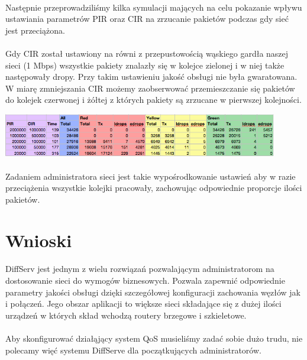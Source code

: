 \documentclass[a4paper]{article}
\begin{document}
\paragraph{}
Następnie przeprowadziliśmy kilka symulacji mających na celu pokazanie wpływu ustawiania parametrów PIR oraz CIR na zrzucanie pakietów podczas gdy sieć jest przeciążona.

\paragraph{}
Gdy CIR został ustawiony na równi z przepustowością wąskiego gardła naszej sieci (1 Mbps) wszystkie pakiety znalazły się w kolejce zielonej i w niej także następowały dropy. Przy takim ustawieniu jakość obsługi nie była gwaratowana.
W miarę zmniejszania CIR możemy zaobserwować przemieszczanie się pakietów do kolejek czerwonej i żółtej z których pakiety są zrzucane w pierwszej kolejności.



\includegraphics[width=120mm]{images/punkt_3_tabela.png}

\paragraph{}
Zadaniem administratora sieci jest takie wypośrodkowanie ustawień aby w razie przeciążenia wszystkie kolejki pracowały, zachowując odpowiednie proporcje ilości pakietów.

\section{Wnioski}

\paragraph{}
DiffServ jest jednym z wielu rozwiązań pozwalającym administratorom na dostosowanie sieci do wymogów biznesowych. Pozwala zapewnić odpowiednie parametry jakości obsługi dzięki szczegółowej konfiguracji zachowania węzłów jak i połączeń. Jego obszar aplikacji to większe sieci składające się z dużej ilości urządzeń w których skład wchodzą routery brzegowe i szkieletowe.

\paragraph{}
Aby skonfigurować działąjący system QoS musieliśmy zadać sobie dużo trudu, nie polecamy więć systemu DiffServe dla początkujących administratorów.
\end{document}
